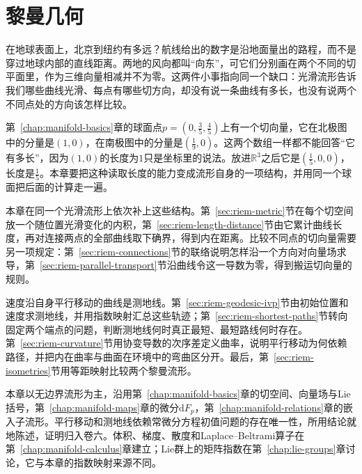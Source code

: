 \chapter{黎曼几何}
\label{chap:riemannian-geometry}

在地球表面上，北京到纽约有多远？航线给出的数字是沿地面量出的路程，而不是穿过地球内部的直线距离。两地的风向都叫“向东”，可它们分别画在两个不同的切平面里，作为三维向量相减并不为零。这两件小事指向同一个缺口：光滑流形告诉我们哪些曲线光滑、每点有哪些切方向，却没有说一条曲线有多长，也没有说两个不同点处的方向该怎样比较。

第~\ref{chap:manifold-basics}章的球面点$p=(0,\tfrac35,\tfrac45)$上有一个切向量，它在北极图中的分量是$(1,0)$，在南极图中的分量是$(\tfrac19,0)$。这两个数组一样都不能回答“它有多长”，因为$(1,0)$的长度为$1$只是坐标里的说法。放进$\mathbb R^3$之后它是$(\tfrac15,0,0)$，长度是$\tfrac15$。本章要把这种读取长度的能力变成流形自身的一项结构，并用同一个球面把后面的计算走一遍。

本章在同一个光滑流形上依次补上这些结构。第~\ref{sec:riem-metric}节在每个切空间放一个随位置光滑变化的内积，第~\ref{sec:riem-length-distance}节由它累计曲线长度，再对连接两点的全部曲线取下确界，得到内在距离。比较不同点的切向量需要另一项规定：第~\ref{sec:riem-connections}节的联络说明怎样沿一个方向对向量场求导，第~\ref{sec:riem-parallel-transport}节沿曲线令这一导数为零，得到搬运切向量的规则。

速度沿自身平行移动的曲线是测地线。第~\ref{sec:riem-geodesic-ivp}节由初始位置和速度求测地线，并用指数映射汇总这些轨迹；第~\ref{sec:riem-shortest-paths}节转向固定两个端点的问题，判断测地线何时真正最短、最短路线何时存在。第~\ref{sec:riem-curvature}节用协变导数的次序差定义曲率，说明平行移动为何依赖路径，并把内在曲率与曲面在环境中的弯曲区分开。最后，第~\ref{sec:riem-isometries}节用等距映射比较两个黎曼流形。

本章以无边界流形为主，沿用第~\ref{chap:manifold-basics}章的切空间、向量场与Lie括号，第~\ref{chap:manifold-maps}章的微分$\mathrm dF_p$，第~\ref{chap:manifold-relations}章的嵌入子流形。平行移动和测地线依赖常微分方程初值问题的存在唯一性，所用结论就地陈述，证明归入卷六。体积、梯度、散度和Laplace--Beltrami算子在第~\ref{chap:manifold-calculus}章建立；Lie群上的矩阵指数在第~\ref{chap:lie-groups}章讨论，它与本章的指数映射来源不同。










